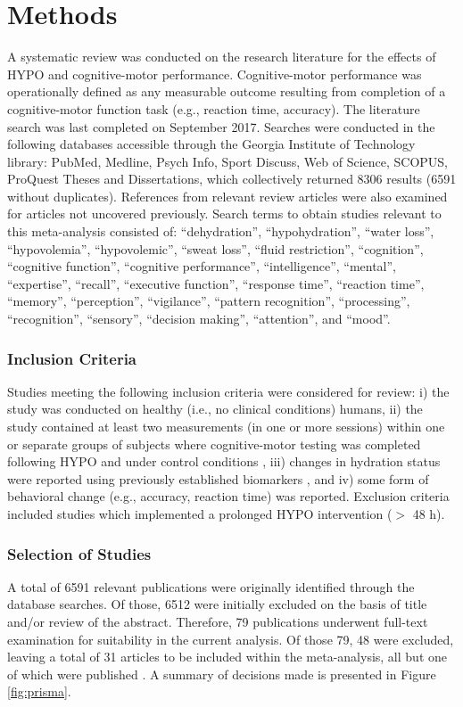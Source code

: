 \section{Methods}
A systematic review was conducted on the research literature for the effects of HYPO and cognitive-motor performance. Cognitive-motor performance was operationally defined as any measurable outcome resulting from completion of a cognitive-motor function task (e.g., reaction time, accuracy). The literature search was last completed on September 2017. Searches were conducted in the following databases accessible through the Georgia Institute of Technology library: PubMed, Medline, Psych Info, Sport Discuss, Web of Science, SCOPUS, ProQuest Theses and Dissertations, which collectively returned 8306 results (6591 without duplicates). References from relevant review articles were also examined \cite{lieberman_hydration_2007,masento_effects_2014,benton_small_2015,nuccio_fluid_2017} for articles not uncovered previously. Search terms to obtain studies relevant to this meta-analysis consisted of: ``dehydration'', ``hypohydration'', ``water loss'', ``hypovolemia'', ``hypovolemic'', ``sweat loss'', ``fluid restriction'', ``cognition'', ``cognitive function'', ``cognitive performance'', ``intelligence'', ``mental'', ``expertise'', ``recall'', ``executive function'', ``response time'', ``reaction time'', ``memory'', ``perception'', ``vigilance'', ``pattern recognition'', ``processing'', ``recognition'', ``sensory'', ``decision making'', ``attention'', and ``mood''. 

\subsubsection{Inclusion Criteria}
Studies meeting the following inclusion criteria were considered for review: i) the study was conducted on healthy (i.e., no clinical conditions) humans, ii) the study contained at least two measurements (in one or more sessions) within one or separate  groups of subjects where cognitive-motor testing was completed following HYPO and under control conditions , iii) changes in hydration status were reported using previously established biomarkers \cite{cheuvront_physiologic_2013}, and iv) some form of behavioral change (e.g., accuracy, reaction time) was reported. Exclusion criteria included studies which implemented a prolonged HYPO intervention (${>}$ 48 h).     

\subsubsection{Selection of Studies}
A total of 6591 relevant publications were originally identified through the database searches. Of those, 6512 were initially excluded on the basis of title and/or review of the abstract. Therefore, 79 publications underwent full-text examination for suitability in the current analysis. Of those 79, 48 were excluded, leaving a total of 31 articles to be included within the meta-analysis, all but one of which were published \cite{kakos_improving_2013}. A summary of decisions made is presented in Figure \ref{fig:prisma}.

